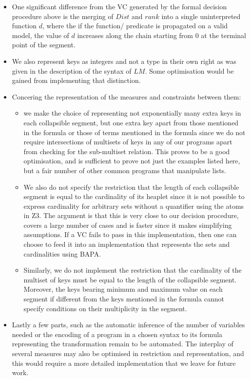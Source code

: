 \begin{itemize}
\item{} One significant difference from the VC generated by the formal decision procedure above is the merging of $Dist$ and $rank$ into a single uninterpreted function $d$, where the if the function/ predicate is propagated on a valid model, the value of $d$ increases along the chain starting from $0$ at the terminal point of the segment.

\item{}We also represent keys as integers and not a type in their own right as was given in the description of the syntax of $LM$. Some optimisation would be gained from implementing that distinction.   

\item{}Concering the representation of the measures and constraints between them:
	\begin{itemize}
 	\item{} we make the choice of representing not exponentially many extra keys in each collapsible segment, but one extra key apart from those mentioned in the formula or those of terms mentioned in the formula since we do not require intersections of multisets of keys in any of our programs apart from checking for the sub-multiset relation. This proves to be a good optimisation, and is sufficient to prove not just the examples listed here, but a fair number of other common programs that manipulate lists. 
	\item{} We also do not specify the restriction that the length of each collapsible segment is equal to the cardinality of its heaplet since it is not possible to express cardinality for arbitrary sets without a quantifier using the atoms in Z3. The argument is that this is very close to our decision procedure, covers a large number of cases and is faster since it makes simplifying assumptions. If a VC fails to pass in this implementation, then one can choose to feed it into an implementation that represents the sets and cardinalities using BAPA. 
	\item{} Similarly, we do not implement the restriction that the cardinality of the multiset of keys must be equal to the length of the collapsible segment. Moreover, the keys bearing minimum and maximum value on each segment if different from the keys mentioned in the formula cannot specify conditions on their multiplicity in the segment.
	\end{itemize}
\item{} Lastly a few parts, such as the automatic inference of the number of variables needed or the encoding of a program in a chosen syntax to its formula representing the transformation remain to be automated. The interplay of several measures may also be optimised in restriction and representation, and this would require a more detailed implementation that we leave for future work.
\end{itemize}

